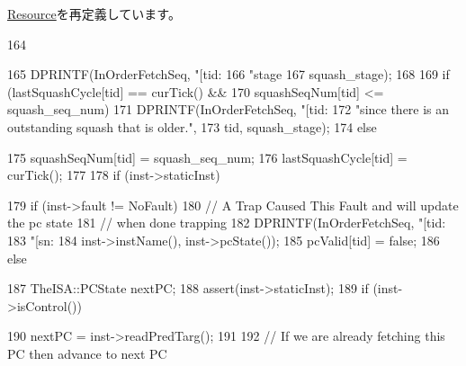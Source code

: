 \hyperlink{classResource_a52235c5e3d912452f254dc45f1496fd2}{Resource}を再定義しています。


\begin{DoxyCode}
164 {
165     DPRINTF(InOrderFetchSeq, "[tid:%
166             "stage %
167             squash_stage);
168 
169     if (lastSquashCycle[tid] == curTick() &&
170         squashSeqNum[tid] <= squash_seq_num) {
171         DPRINTF(InOrderFetchSeq, "[tid:%
172                 "since there is an outstanding squash that is older.\n",
173                 tid, squash_stage);
174     } else {
175         squashSeqNum[tid] = squash_seq_num;
176         lastSquashCycle[tid] = curTick();
177 
178         if (inst->staticInst) {
179             if (inst->fault != NoFault) {
180                 // A Trap Caused This Fault and will update the pc state
181                 // when done trapping
182                 DPRINTF(InOrderFetchSeq, "[tid:%
183                         "[sn:%
184                         inst->instName(), inst->pcState());
185                 pcValid[tid] = false;
186             } else {
187                 TheISA::PCState nextPC;
188                 assert(inst->staticInst);
189                 if (inst->isControl()) {
190                     nextPC = inst->readPredTarg();
191 
192                     // If we are already fetching this PC then advance to next PC
      
}}}}}
\end{DoxyCode}
